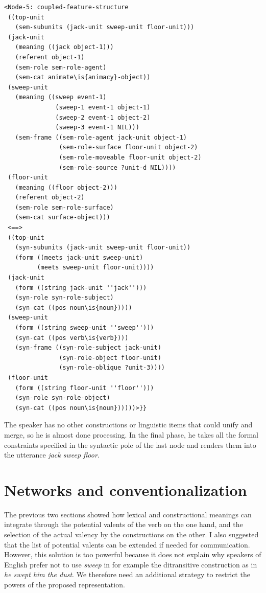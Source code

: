 \ea
\begin{lstlisting}
<Node-5: coupled-feature-structure
 ((top-unit
   (sem-subunits (jack-unit sweep-unit floor-unit)))
 (jack-unit
   (meaning ((jack object-1)))
   (referent object-1)
   (sem-role sem-role-agent)
   (sem-cat animate\is{animacy}-object))
 (sweep-unit
   (meaning ((sweep event-1)
              (sweep-1 event-1 object-1)
              (sweep-2 event-1 object-2)
              (sweep-3 event-1 NIL)))
   (sem-frame ((sem-role-agent jack-unit object-1)
               (sem-role-surface floor-unit object-2)
               (sem-role-moveable floor-unit object-2)
               (sem-role-source ?unit-d NIL))))
 (floor-unit
   (meaning ((floor object-2)))
   (referent object-2)
   (sem-role sem-role-surface)
   (sem-cat surface-object)))
 <==>
 ((top-unit
   (syn-subunits (jack-unit sweep-unit floor-unit))
   (form ((meets jack-unit sweep-unit) 
         (meets sweep-unit floor-unit))))
 (jack-unit
   (form ((string jack-unit ''jack'')))
   (syn-role syn-role-subject)
   (syn-cat ((pos noun\is{noun}))))
 (sweep-unit
   (form ((string sweep-unit ''sweep'')))
   (syn-cat ((pos verb\is{verb})))
   (syn-frame ((syn-role-subject jack-unit)
               (syn-role-object floor-unit)
               (syn-role-oblique ?unit-3))))
 (floor-unit
   (form ((string floor-unit ''floor'')))
   (syn-role syn-role-object)
   (syn-cat ((pos noun\is{noun})))))>}}

\end{lstlisting}
\z

The speaker has no other constructions or linguistic items that could unify and merge, so he is almost done processing. In the final phase, he takes all the formal constraints specified in the syntactic pole of the last node and renders them into the utterance {\em jack sweep floor}.

\section{Networks and conventionalization}

The previous two sections showed how lexical and constructional meanings can integrate through the potential valents of the verb on the one hand, and the selection of the actual valency by the constructions on the other. I also suggested that the list of potential valents can be extended if needed for communication. However, this solution is too powerful because it does not explain why speakers of English prefer not to use {\em sweep} in for example the ditransitive construction as in {\em *he swept him the dust}. We therefore need an additional strategy to restrict the powers of the proposed representation.

